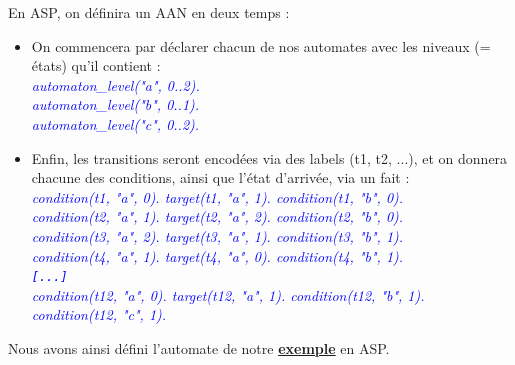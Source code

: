 \documentclass[12pt,a4paper]{article}
\begin{document}
En ASP, on définira un AAN en deux temps :
\begin{itemize}
	\item On commencera par déclarer chacun de nos automates avec les niveaux (= états) qu'il contient :\\
	\emph{
		\textcolor{blue}{
		automaton\_level("a", 0..2).\\
		automaton\_level("b", 0..1).\\
		automaton\_level("c", 0..2).\\
		}
	}
	\item Enfin, les transitions seront encodées via des labels (t1, t2, ...), et on donnera chacune des conditions, ainsi que l'état d'arrivée, via un fait :\\
	\emph{
		\textcolor{blue}{
		condition(t1, "a", 0). target(t1, "a", 1). condition(t1, "b", 0).\\
		condition(t2, "a", 1). target(t2, "a", 2). condition(t2, "b", 0).\\
		condition(t3, "a", 2). target(t3, "a", 1). condition(t3, "b", 1).\\
		condition(t4, "a", 1). target(t4, "a", 0). condition(t4, "b", 1).\\
		\verb![...]!\\
		condition(t12, "a", 0). target(t12, "a", 1). condition(t12, "b", 1). condition(t12, "c", 1).\\
		}
	}
\end{itemize}
Nous avons ainsi défini l'automate de notre \hyperlink{exemple}{\textbf{exemple}} en ASP.
\end{document}
